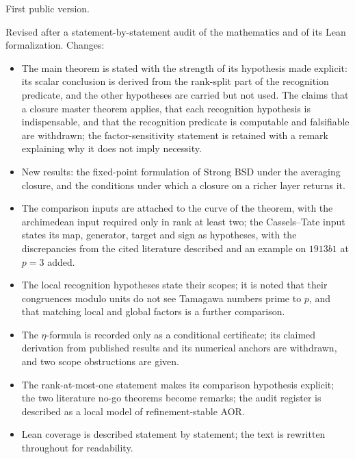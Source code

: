 \documentclass[11pt]{article}
\theoremstyle{definition}
\begin{document}
\begin{description}[leftmargin=2.4em, style=nextline]
\item[v1, 31 August 2026] First public version.
\item[v2, 4 October 2026] Revised after a statement-by-statement audit
  of the mathematics and of its Lean formalization.  Changes:
  \begin{itemize}
  \item The main theorem is stated with the strength of its hypothesis
    made explicit: its scalar conclusion is derived from the rank-split
    part of the recognition predicate, and the other hypotheses are
    carried but not used.  The claims that a closure master theorem
    applies, that each recognition hypothesis is indispensable, and that
    the recognition predicate is computable and falsifiable are
    withdrawn; the factor-sensitivity statement is retained with a remark
    explaining why it does not imply necessity.
  \item New results: the fixed-point formulation of Strong BSD under the
    averaging closure, and the conditions under which a closure on a
    richer layer returns it.
  \item The comparison inputs are attached to the curve of the theorem,
    with the archimedean input required only in rank at least two; the
    Cassels--Tate input states its map, generator, target and sign as
    hypotheses, with the discrepancies from the cited literature
    described and an example on $1913b1$ at $p=3$ added.
  \item The local recognition hypotheses state their scopes; it is noted
    that their congruences modulo units do not see Tamagawa numbers prime
    to $p$, and that matching local and global factors is a further
    comparison.
  \item The $\eta$-formula is recorded only as a conditional certificate;
    its claimed derivation from published results and its numerical
    anchors are withdrawn, and two scope obstructions are given.
  \item The rank-at-most-one statement makes its comparison hypothesis
    explicit; the two literature no-go theorems become remarks; the audit
    register is described as a local model of refinement-stable AOR.
  \item Lean coverage is described statement by statement; the text is
    rewritten throughout for readability.
  \end{itemize}
\end{description}
 
\end{document}
